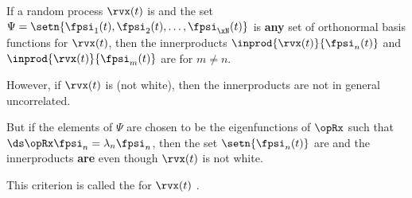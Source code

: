 \begin{liste}
  \item If a random process $\rvx(t)$ is  
        and the set $\Psi=\setn{\fpsi_1(t),\fpsi_2(t),\ldots,\fpsi_\xN(t)}$
        is \textbf{any} set of orthonormal basis functions for $\rvx(t)$, then the innerproducts
        $\inprod{\rvx(t)}{\fpsi_n(t)}$ and $\inprod{\rvx(t)}{\fpsi_m(t)}$ are 
        for $m\ne  n$.
  \item However, if $\rvx(t)$ is  (not white), then the innerproducts are not
        in general uncorrelated.
  \item But if the elements of $\Psi$ are chosen to be the eigenfunctions of $\opRx$ such that $\ds\opRx \fpsi_n = \lambda_n \fpsi_n$,
        then the set $\setn{\fpsi_n(t)}$ are   and
        the innerproducts \textbf{are}  even though $\rvx(t)$ is not white.
  \item This criterion is called the  for $\rvx(t)$ .
\end{liste}

